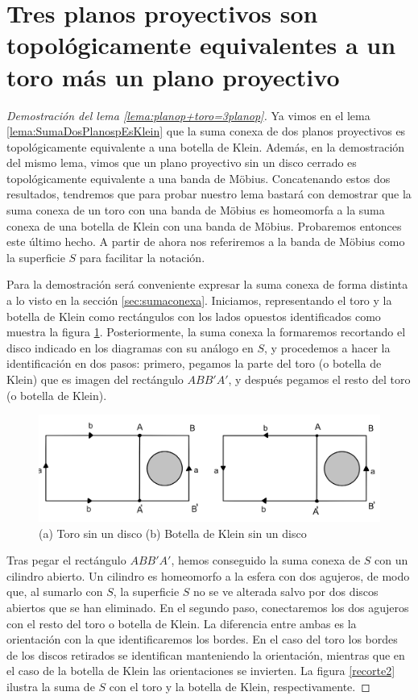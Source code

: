 \documentclass[a4paper,11pt,spanish, twoside, leqno]{tfg-uam}
\theoremstyle{definition}
\begin{document}
\section{Tres planos proyectivos son topológicamente equivalentes a un toro más un plano proyectivo}
\label{anexo:lema1}
\begin{proof}[Demostración del lema \ref{lema:planop+toro=3planop}]


Ya vimos en  el lema \ref{lema:SumaDosPlanospEsKlein} que la suma conexa de dos planos proyectivos es topológicamente equivalente a una botella de Klein. Además, en la demostración del mismo lema, vimos que un plano proyectivo sin un disco cerrado es topológicamente equivalente a una banda de M\"obius. Concatenando estos dos resultados, tendremos que para probar nuestro lema bastará con demostrar que la suma conexa de un toro con una banda de M\"obius es homeomorfa a la suma conexa de una botella de Klein con una banda de M\"obius. Probaremos entonces este último hecho. A partir de ahora nos referiremos a la banda de M\"obius como la superficie $S$ para facilitar la notación.

Para la demostración será conveniente expresar la suma conexa de forma distinta a lo visto en la sección \ref{sec:sumaconexa}. Iniciamos, representando el toro y la botella de Klein como rectángulos con los lados opuestos identificados como muestra la figura \ref{recorte1}. Posteriormente, la suma conexa la formaremos recortando el disco indicado en los diagramas  con su análogo en $S$, y procedemos a hacer la identificación en dos pasos: primero, pegamos la parte del toro (o botella de Klein) que es imagen del rectángulo $ABB'A'$, y después pegamos el resto del toro (o botella de Klein). 

\begin{figure}[h!]
	\centering
	\includegraphics[width=0.5\linewidth]{imagenes/recorte1.png}
	\caption{(a) Toro sin un disco    (b) Botella de Klein sin un disco}
    \label{recorte1}
\end{figure}

Tras pegar el rectángulo $ABB'A'$, hemos conseguido la suma conexa de $S$ con un cilindro abierto.  Un cilindro es homeomorfo a la esfera con dos agujeros, de modo que, al sumarlo con $S$, la superficie $S$ no se ve alterada salvo por dos discos abiertos que se han eliminado. En el segundo paso, conectaremos los dos agujeros con el resto del toro o botella de Klein. La diferencia entre ambas es la orientación con la que identificaremos los bordes. En el caso del toro los bordes de los discos retirados se identifican manteniendo la orientación, mientras que en el caso de la botella de Klein las orientaciones se invierten. La figura \ref{recorte2} ilustra la suma de $S$ con el toro y la botella de Klein, respectivamente. 


\end{proof}
\end{document}
